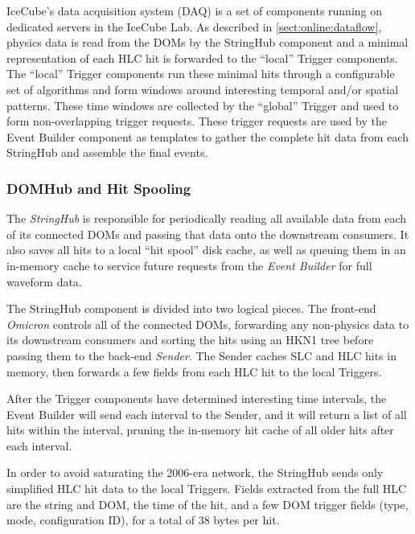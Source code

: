 IceCube's data acquisition system (DAQ) is a set of components running on
dedicated servers in the IceCube Lab.  As described in
\ref{sect:online:dataflow}, physics data is read from the DOMs by the StringHub
component and a minimal representation of each HLC hit is forwarded to the
``local'' Trigger components.  The ``local'' Trigger components run these
minimal hits through a configurable set of algorithms and form windows around
interesting temporal and/or spatial patterns.  These time windows are collected
by the ``global'' Trigger and used to form non-overlapping trigger requests.
These trigger requests are used by the Event Builder component as templates to
gather the complete hit data from each StringHub and assemble the final events.

\subsubsection{DOMHub and Hit Spooling}

The \emph{StringHub} is responsible for periodically reading all available data
from each of its connected DOMs and passing that data onto the downstream
consumers.  It also saves all hits to a local ``hit spool'' disk cache, as
well as queuing them in an in-memory cache to service future requests from
the \emph{Event Builder} for full waveform data.

The StringHub component is divided into two logical pieces.  The front-end
\emph{Omicron} controls all of the connected DOMs, forwarding any
non-physics data to its downstream consumers and sorting the hits using
an HKN1 tree before passing them to the back-end \emph{Sender}.  The Sender
caches SLC and HLC hits in memory, then forwards a few fields from each HLC
hit to the local Triggers.

After the
Trigger components have determined interesting time intervals, the Event
Builder will send each interval to the Sender, and it will return a list of
all hits within the interval, pruning the in-memory hit cache of all older hits
after each interval.

In order to avoid saturating the 2006-era network, the StringHub sends only
simplified HLC hit data to the local Triggers.  Fields extracted from the
full HLC are the string and DOM, the time of the hit, and a few DOM trigger
fields (type, mode, configuration ID), for a total of 38 bytes per hit.


